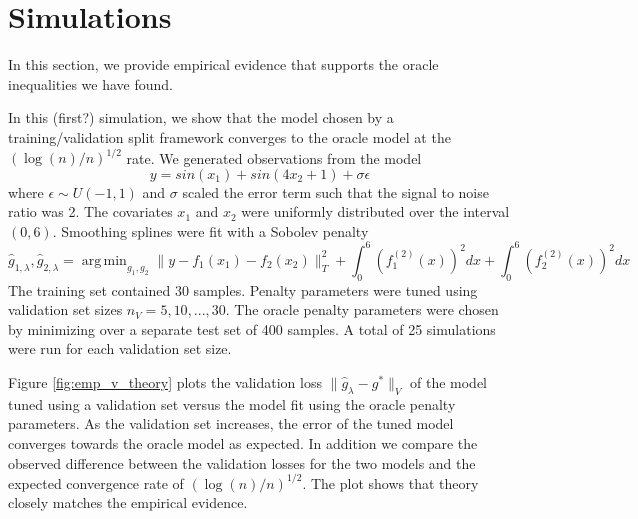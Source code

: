 \documentclass[12pt]{article}
\DeclareMathOperator*{\argmin}{arg\,min}
\begin{document}
\section{Simulations}

In this section, we provide empirical evidence that supports the oracle inequalities we have found.

In this (first?) simulation, we show that the model chosen by a training/validation split framework converges to the oracle model at the $(\log(n)/n)^{1/2}$ rate. We generated observations from the model
\begin{equation}
y = sin(x_1) + sin(4 x_2 + 1) + \sigma \epsilon
\end{equation}
where $\epsilon \sim U(-1,1)$ and $\sigma$ scaled the error term such that the signal to noise ratio was 2.
The covariates $x_1$ and $x_2$ were uniformly distributed over the interval $(0,6)$.
Smoothing splines were fit with a Sobolev penalty
\begin{equation}
\hat{g}_{1, \lambda}, \hat{g}_{2, \lambda} = \argmin_{g_1, g_2} \| y - f_1(x_1) - f_2(x_2) \|_T^2 + \int_0^6 (f_1^{(2)}(x))^2 dx + \int_0^6 (f_2^{(2)}(x))^2 dx
\end{equation}
The training set contained 30 samples. Penalty parameters were tuned using validation set sizes $n_V = 5, 10, ..., 30$. The oracle penalty parameters were chosen by minimizing over a separate test set of 400 samples. A total of 25 simulations were run for each validation set size.

Figure \ref{fig:emp_v_theory} plots the validation loss $\| \hat{g}_{\lambda} - g^* \|_V$ of the model tuned using a validation set versus the model fit using the oracle penalty parameters. As the validation set increases, the error of the tuned model converges towards the oracle model as expected. In addition we compare the observed difference between the validation losses for the two models and the expected convergence rate of $(\log(n)/n)^{1/2}$. The plot shows that theory closely matches the empirical evidence.
\end{document}
